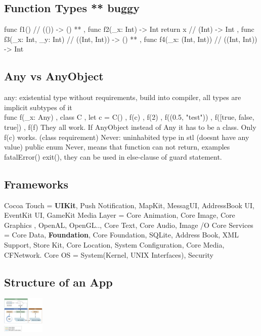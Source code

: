 \subsection{Function Types ** buggy}
func f1() {}  // (()) -> () **
, func f2(\_x: Int) -> Int { return x } // (Int) -> Int
, func f3(\_x: Int, \_y: Int) {} // ((Int, Int)) -> () **
, func f4(\_x: (Int, Int)) {} // ((Int, Int)) -> Int


\subsection{Any vs AnyObject}
any: existential type without requirements, build into compiler, all types are implicit subtypes of it \\
func f(\_x: Any) {}
, class C {}
, let c = C()
, f(c)
, f(2)
, f((0.5, "test"))
, f([true, false, true])
, f(f)
They all work. If AnyObject instead of Any it has to be a class. Only f(c) works. (class requirement)
Never: uninhabited type in stl (doesnt have any value) public enum Never{}, means that function can not return, examples fatalError() exit(), they can be used in else-clause of guard statement.

\subsection{Frameworks}
Cocoa Touch = \textbf{UIKit}, Push Notification, MapKit, MessagUI, AddressBook UI, EventKit UI, GameKit
Media Layer = Core Animation, Core Image, Core Graphics , OpenAL, OpenGL.., Core Text, Core Audio, Image /O
Core Services = Core Data, \textbf{Foundation}, Core Foundation, SQLite, Address Book, XML Support, Store Kit, Core Location, System Configuration, Core Media, CFNetwork.
Core OS = System(Kernel, UNIX Interfaces), Security

\subsection{Structure of an App}
\includegraphics[width=0.15\textwidth]{appstructure.png}

